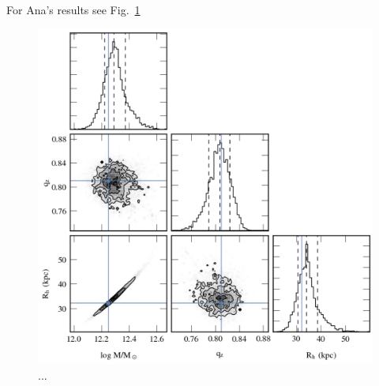 For Ana's results see Fig.~\ref{plot_ana_results}
\begin{figure}
\includegraphics[width=168mm]{ana_results.png}
  \caption{...}
  \label{plot_ana_results}
\end{figure}
